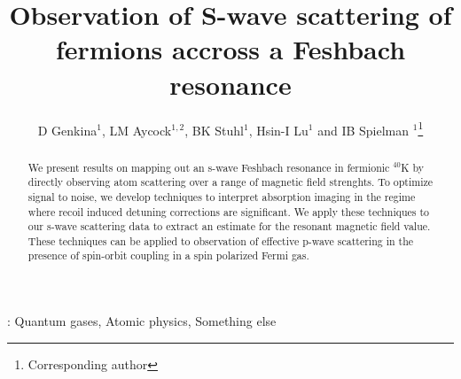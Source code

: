 \documentclass[12pt]{iopart}
\begin{document}
\title[]{Observation of S-wave scattering of fermions accross a Feshbach resonance}

\author{D Genkina$^1$, LM Aycock$^{1,2}$, BK Stuhl$^1$, Hsin-I Lu$^1$ and IB Spielman
$^1$\footnote{Corresponding author}}

\address{$^1$Joint Quantum Institute, National Institute of Standards and Technology, and University of Maryland, Gaithersburg, MD, 20899 USA}
\address{$^2$Physics Department, Cornell University, Ithaca, NY 14850 USA}


\begin{abstract}
We present results on mapping out an s-wave Feshbach resonance in fermionic $^{40}$K by directly observing atom scattering over a range of 
magnetic field strenghts. To optimize signal to noise, we develop techniques to interpret absorption imaging in the regime where recoil induced 
detuning corrections are significant. We apply these techniques to our s-wave scattering data to extract an estimate for the resonant magnetic
field value. These techniques can be applied to observation of effective p-wave scattering in the presence of spin-orbit coupling in a spin polarized 
Fermi gas.
\end{abstract}

\vspace{2pc}
: Quantum gases, Atomic physics, Something else

\maketitle
\end{document}

